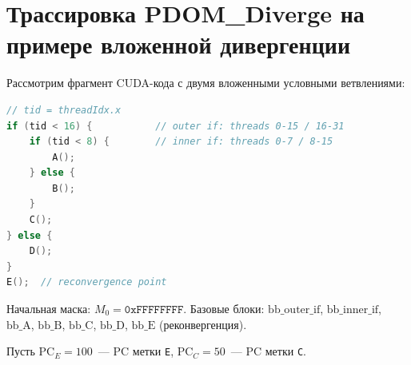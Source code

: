 \section{Трассировка PDOM\_Diverge на примере вложенной дивергенции}
\label{app:pdom_trace}

Рассмотрим фрагмент CUDA-кода с двумя вложенными условными ветвлениями:

\begin{lstlisting}[language=C++, caption={Пример вложенной дивергенции}]
// tid = threadIdx.x
if (tid < 16) {           // outer if: threads 0-15 / 16-31
    if (tid < 8) {        // inner if: threads 0-7 / 8-15
        A();
    } else {
        B();
    }
    C();
} else {
    D();
}
E();  // reconvergence point
\end{lstlisting}

Начальная маска: $M_0 = \texttt{0xFFFFFFFF}$.
Базовые блоки: $\mathrm{bb\_outer\_if}$, $\mathrm{bb\_inner\_if}$,
$\mathrm{bb\_A}$, $\mathrm{bb\_B}$, $\mathrm{bb\_C}$, $\mathrm{bb\_D}$,
$\mathrm{bb\_E}$ (реконвергенция).

Пусть $\mathrm{PC}_E = 100$~--- PC метки \texttt{E},
$\mathrm{PC}_C = 50$~--- PC метки \texttt{C}.

